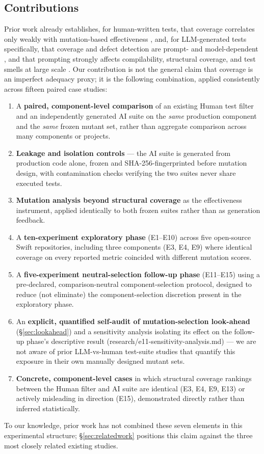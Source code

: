 \documentclass[10pt,conference]{IEEEtran}
\begin{document}
\subsection{Contributions}
Prior work already establishes, for human-written tests, that coverage correlates only weakly with mutation-based effectiveness \cite{inozemtseva2014}, and, for LLM-generated tests specifically, that coverage and defect detection are prompt- and model-dependent \cite{yang2024ase}, and that prompting strongly affects compilability, structural coverage, and test smells at large scale \cite{ouedraogo2026}. Our contribution is not the general claim that coverage is an imperfect adequacy proxy; it is the following combination, applied consistently across fifteen paired case studies:
\begin{enumerate}
\item A \textbf{paired, component-level comparison} of an existing Human test filter and an independently generated AI suite on the \emph{same} production component and the \emph{same} frozen mutant set, rather than aggregate comparison across many components or projects.
\item \textbf{Leakage and isolation controls} — the AI suite is generated from production code alone, frozen and SHA-256-fingerprinted before mutation design, with contamination checks verifying the two suites never share executed tests.
\item \textbf{Mutation analysis beyond structural coverage} as the effectiveness instrument, applied identically to both frozen suites rather than as generation feedback.
\item A \textbf{ten-experiment exploratory phase} (E1--E10) across five open-source Swift repositories, including three components (E3, E4, E9) where identical coverage on every reported metric coincided with different mutation scores.
\item A \textbf{five-experiment neutral-selection follow-up phase} (E11--E15) using a pre-declared, comparison-neutral component-selection protocol, designed to reduce (not eliminate) the component-selection discretion present in the exploratory phase.
\item An \textbf{explicit, quantified self-audit of mutation-selection look-ahead} (\S\ref{sec:lookahead}) and a sensitivity analysis isolating its effect on the follow-up phase's descriptive result (research/e11-sensitivity-analysis.md) — we are not aware of prior LLM-vs-human test-suite studies that quantify this exposure in their own manually designed mutant sets.
\item \textbf{Concrete, component-level cases} in which structural coverage rankings between the Human filter and AI suite are identical (E3, E4, E9, E13) or actively misleading in direction (E15), demonstrated directly rather than inferred statistically.
\end{enumerate}
To our knowledge, prior work has not combined these seven elements in this experimental structure; \S\ref{sec:relatedwork} positions this claim against the three most closely related existing studies.
\end{document}

